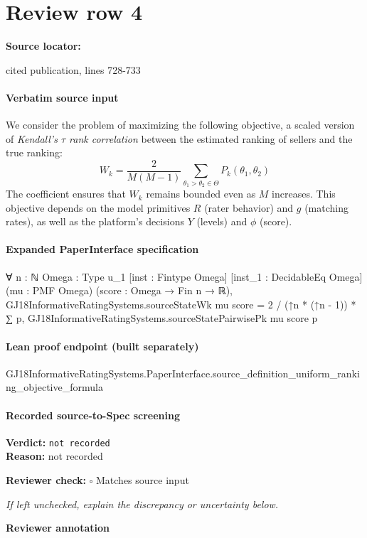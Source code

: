 \documentclass[10pt]{article}
\newcommand{\reviewerbox}{%
  \par\noindent\fbox{\parbox{0.96\linewidth}{\rule{0pt}{0.38in}}}\par
}
\newcommand{\reviewmatch}[1]{%
  \par\noindent\textbf{Reviewer check:} $\square$\; #1\par
  \noindent\emph{If left unchecked, explain the discrepancy or uncertainty below.}\par
}
\begin{document}
\section*{Review row 4}
\textbf{Source locator:} {\footnotesize\raggedright cited publication, lines 728-\allowbreak{}733\par}
\paragraph{Verbatim source input}
\begin{ReviewVerbatim}
We consider the problem of maximizing the following objective, a scaled version of {\em Kendall's $\tau$ rank correlation} between the estimated ranking of sellers and the true ranking:
\begin{equation}
\label{eq:objective}
W_k = \frac{2}{M(M-1)}\sum_{\theta_1 > \theta_2 \in \Theta} P_k(\theta_1, \theta_2)
\end{equation}
The coefficient ensures that ${W}_k$ remains bounded even as $M$ increases. This objective depends on the model primitives $R$ (rater behavior) and $g$ (matching rates), as well as the platform's decisions $Y$ (levels) and $\phi$ (score).
\end{ReviewVerbatim}


\paragraph{Expanded PaperInterface specification}
\begin{ReviewVerbatim}
∀ {n : ℕ} {Omega : Type u_1} [inst : Fintype Omega] [inst_1 : DecidableEq Omega] (mu : PMF Omega)
  (score : Omega → Fin n → ℝ),
  GJ18InformativeRatingSystems.sourceStateWk mu score =
    2 / (↑n * (↑n - 1)) * ∑ p, GJ18InformativeRatingSystems.sourceStatePairwisePk mu score p
\end{ReviewVerbatim}

\paragraph{Lean proof endpoint (built separately)}\begin{ReviewVerbatim}
GJ18InformativeRatingSystems.PaperInterface.source_definition_uniform_ranking_objective_formula
\end{ReviewVerbatim}

\paragraph{Recorded source-to-Spec screening}
\textbf{Verdict:} \texttt{not recorded}
\\
\textbf{Reason:} not recorded
\reviewmatch{Matches source input}
\noindent\textbf{Reviewer annotation}\par
\reviewerbox
\clearpage
\hypertarget{source-claim-62699e0d2b178e68}{}
\end{document}
